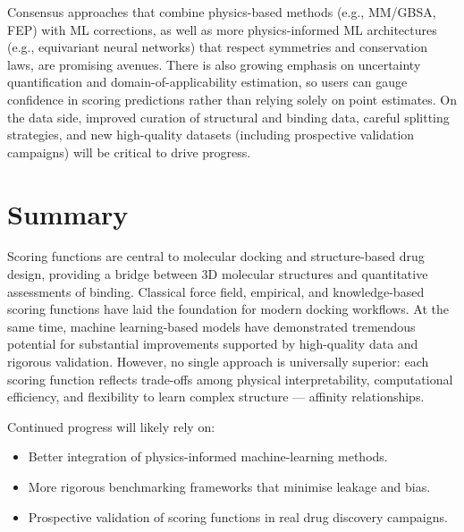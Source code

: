 \documentclass[12pt]{article}
\begin{document}
Consensus approaches that combine physics-based methods (e.g., MM/GBSA, FEP) with ML corrections, as well as more physics-informed ML architectures (e.g., equivariant neural networks) that respect symmetries and conservation laws, are promising avenues. There is also growing emphasis on uncertainty quantification and domain-of-applicability estimation, so users can gauge confidence in scoring predictions rather than relying solely on point estimates. On the data side, improved curation of structural and binding data, careful splitting strategies, and new high-quality datasets (including prospective validation campaigns) will be critical to drive progress\cite{CH3_Liu2015_PDBbind}.

\section{Summary}
Scoring functions are central to molecular docking and structure-based drug design, providing a bridge between 3D molecular structures and quantitative assessments of binding. Classical force field, empirical, and knowledge-based scoring functions have laid the foundation for modern docking workflows. At the same time, machine learning-based models have demonstrated tremendous potential for substantial improvements supported by high-quality data and rigorous validation. However, no single approach is universally superior: each scoring function reflects trade-offs among physical interpretability, computational efficiency, and flexibility to learn complex structure — affinity relationships. 

Continued progress will likely rely on:
\begin{itemize}
    \item Better integration of physics-informed machine-learning methods.
    \item More rigorous benchmarking frameworks that minimise leakage and bias.
    \item Prospective validation of scoring functions in real drug discovery campaigns.
\end{itemize}



\end{document}
